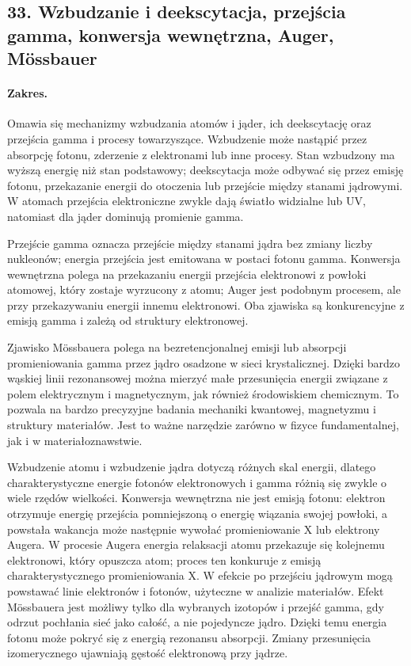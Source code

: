 \documentclass[11pt,a4paper]{article}
\begin{document}
\subsection{33. Wzbudzanie i deekscytacja, przejścia gamma, konwersja wewnętrzna, Auger, Mössbauer}
\paragraph{Zakres.} Omawia się mechanizmy wzbudzania atomów i jąder, ich deekscytację oraz przejścia gamma i procesy towarzyszące. Wzbudzenie może nastąpić przez absorpcję fotonu, zderzenie z elektronami lub inne procesy. Stan wzbudzony ma wyższą energię niż stan podstawowy; deekscytacja może odbywać się przez emisję fotonu, przekazanie energii do otoczenia lub przejście między stanami jądrowymi. W atomach przejścia elektroniczne zwykle dają światło widzialne lub UV, natomiast dla jąder dominują promienie gamma.\par
Przejście gamma oznacza przejście między stanami jądra bez zmiany liczby nukleonów; energia przejścia jest emitowana w postaci fotonu gamma. Konwersja wewnętrzna polega na przekazaniu energii przejścia elektronowi z powłoki atomowej, który zostaje wyrzucony z atomu; Auger jest podobnym procesem, ale przy przekazywaniu energii innemu elektronowi. Oba zjawiska są konkurencyjne z emisją gamma i zależą od struktury elektronowej.\par
Zjawisko Mössbauera polega na bezretencjonalnej emisji lub absorpcji promieniowania gamma przez jądro osadzone w sieci krystalicznej. Dzięki bardzo wąskiej linii rezonansowej można mierzyć małe przesunięcia energii związane z polem elektrycznym i magnetycznym, jak również środowiskiem chemicznym. To pozwala na bardzo precyzyjne badania mechaniki kwantowej, magnetyzmu i struktury materiałów. Jest to ważne narzędzie zarówno w fizyce fundamentalnej, jak i w materiałoznawstwie.\par

Wzbudzenie atomu i wzbudzenie jądra dotyczą różnych skal energii, dlatego charakterystyczne energie fotonów elektronowych i gamma różnią się zwykle o wiele rzędów wielkości. Konwersja wewnętrzna nie jest emisją fotonu: elektron otrzymuje energię przejścia pomniejszoną o energię wiązania swojej powłoki, a powstała wakancja może następnie wywołać promieniowanie X lub elektrony Augera. W procesie Augera energia relaksacji atomu przekazuje się kolejnemu elektronowi, który opuszcza atom; proces ten konkuruje z emisją charakterystycznego promieniowania X. W efekcie po przejściu jądrowym mogą powstawać linie elektronów i fotonów, użyteczne w analizie materiałów. Efekt Mössbauera jest możliwy tylko dla wybranych izotopów i przejść gamma, gdy odrzut pochłania sieć jako całość, a nie pojedyncze jądro. Dzięki temu energia fotonu może pokryć się z energią rezonansu absorpcji. Zmiany przesunięcia izomerycznego ujawniają gęstość elektronową przy jądrze.
\par
\end{document}
